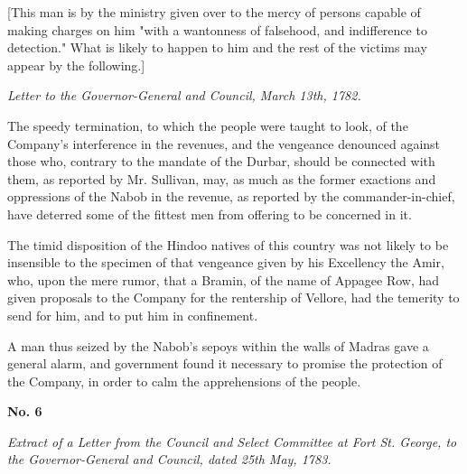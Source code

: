[This man is by the ministry given over to the mercy of persons capable of making charges on him "with a wantonness of falsehood, and indifference to detection." What is likely to happen to him and the rest of the victims may appear by the following.]

\vspace{0.75cm}
\centerline{\textit{Letter to the Governor-General and Council, March 13th, 1782.}}

\vspace{0.2cm}
The speedy termination, to which the people were taught to look, of the Company's interference in the revenues, and the vengeance denounced against those who, contrary to the mandate of the Durbar, should be connected with them, as reported by Mr. Sullivan, may, as much as the former exactions and oppressions of the Nabob in the revenue, as reported by the commander-in-chief, have deterred some of the fittest men from offering to be concerned in it.

The timid disposition of the Hindoo natives of this country was not likely to be insensible to the specimen of that vengeance given by his Excellency the Amir, who, upon the mere rumor, that a Bramin, of the name of Appagee Row, had given proposals to the Company for the rentership of Vellore, had the temerity to send for him, and to put him in confinement.

A man thus seized by the Nabob's sepoys within the walls of Madras gave a general alarm, and government found it necessary to promise the protection of the Company, in order to calm the apprehensions of the people.

\PRLsep
\begin{center}
  \textbf{\large No. 6
  } \par 
\end{center}
\textit{Extract of a Letter from the Council and Select Committee at Fort St. George, to the Governor-General and Council, dated 25th May, 1783.}
\vspace{0.3cm}




